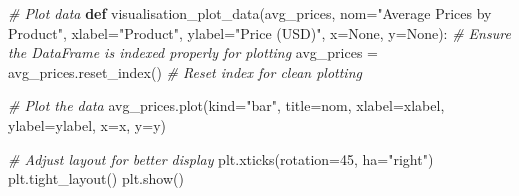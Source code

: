 \documentclass[
]{article}
\newenvironment{Shaded}{}{}
\newcommand{\CommentTok}[1]{\textcolor[rgb]{0.38,0.63,0.69}{\textit{#1}}}
\newcommand{\DecValTok}[1]{\textcolor[rgb]{0.25,0.63,0.44}{#1}}
\newcommand{\KeywordTok}[1]{\textcolor[rgb]{0.00,0.44,0.13}{\textbf{#1}}}
\newcommand{\NormalTok}[1]{#1}
\newcommand{\OperatorTok}[1]{\textcolor[rgb]{0.40,0.40,0.40}{#1}}
\newcommand{\StringTok}[1]{\textcolor[rgb]{0.25,0.44,0.63}{#1}}
\newcommand{\VariableTok}[1]{\textcolor[rgb]{0.10,0.09,0.49}{#1}}
\begin{document}
\hypertarget{9271d49f-896b-4448-a52d-3789bbe8afde}{}
\begin{Shaded}
\begin{Highlighting}[]
\CommentTok{\# Plot data}
\KeywordTok{def}\NormalTok{ visualisation\_plot\_data(avg\_prices, nom}\OperatorTok{=}\StringTok{"Average Prices by Product"}\NormalTok{, xlabel}\OperatorTok{=}\StringTok{"Product"}\NormalTok{, ylabel}\OperatorTok{=}\StringTok{"Price (USD)"}\NormalTok{, x}\OperatorTok{=}\VariableTok{None}\NormalTok{, y}\OperatorTok{=}\VariableTok{None}\NormalTok{):}
    \CommentTok{\# Ensure the DataFrame is indexed properly for plotting}
\NormalTok{    avg\_prices }\OperatorTok{=}\NormalTok{ avg\_prices.reset\_index()  }\CommentTok{\# Reset index for clean plotting}
    
    \CommentTok{\# Plot the data}
\NormalTok{    avg\_prices.plot(kind}\OperatorTok{=}\StringTok{"bar"}\NormalTok{, title}\OperatorTok{=}\NormalTok{nom, xlabel}\OperatorTok{=}\NormalTok{xlabel, ylabel}\OperatorTok{=}\NormalTok{ylabel, x}\OperatorTok{=}\NormalTok{x, y}\OperatorTok{=}\NormalTok{y)}
    
    \CommentTok{\# Adjust layout for better display}
\NormalTok{    plt.xticks(rotation}\OperatorTok{=}\DecValTok{45}\NormalTok{, ha}\OperatorTok{=}\StringTok{"right"}\NormalTok{)}
\NormalTok{    plt.tight\_layout()}
\NormalTok{    plt.show()}
\end{Highlighting}
\end{Shaded}
\end{document}
